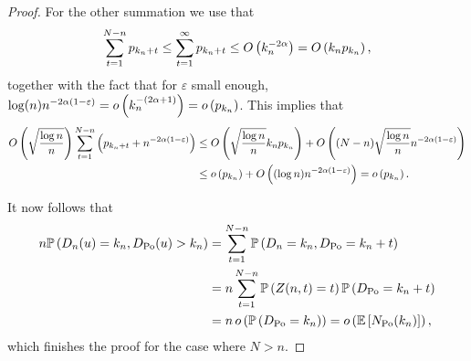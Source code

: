 \begin{proof}
For the other summation we use that
\[
	\sum_{t = 1}^{N-n} p_{k_n + t} \le \sum_{t = 1}^\infty p_{k_n + t}
	\le O\left(k_n^{-2\alpha}\right) = O\left(k_n p_{k_n}\right),
\]
together with the fact that for $\varepsilon$ small enough, $\log(n) n^{-2\alpha(1-\varepsilon)} = o\left(k_n^{-(2\alpha + 1)}\right) = o\left(p_{k_n}\right)$. This implies that
\begin{align*}
	O\left(\sqrt{\frac{\log n}{n}}\right) \sum_{t = 1}^{N-n}
		\left(p_{k_n + t} + n^{-2\alpha(1-\varepsilon)}\right)
	&\le O\left(\sqrt{\frac{\log n}{n}} k_n p_{k_n}\right) + O\left((N-n)\sqrt{\frac{\log n}{n}} n^{-2\alpha(1-\varepsilon)}\right)\\
	&\le o\left(p_{k_n}\right) + O\left((\log n) n^{-2\alpha(1-\varepsilon)}\right) = o\left(p_{k_n}\right).
\end{align*}

It now follows that
\begin{align*}
	n \mathbb{P}\left(D_n(u) = k_n, D_{{\mathrm{Po}}}(u) > k_n\right)
	&= \sum_{t = 1}^{N-n} \mathbb{P}\left(D_n = k_n, D_{{\mathrm{Po}}} = k_n + t\right)\\
	&= n \sum_{t = 1}^{N-n} \mathbb{P}\left(Z(n,t) = t\right)\mathbb{P}\left(D_{{\mathrm{Po}}} = k_n + t\right)\\
	&= n \, o\left(\mathbb{P}\left(D_{{\mathrm{Po}}} = k_n\right)\right) = o\left(\mathbb{E}\left[N_{{\mathrm{Po}}}(k_n)\right]\right),
\end{align*}
which finishes the proof for the case where $N > n$.
\end{proof}

